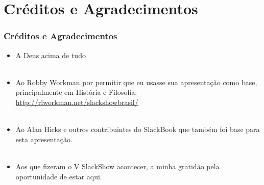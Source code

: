 \documentclass[aspectratio=169]{beamer}
\begin{document}
\section{Créditos e Agradecimentos}

\begin{frame}
	\frametitle{Créditos e Agradecimentos}
	\begin{itemize}
		\item A Deus acima de tudo
		~\\
		~\\
		\item Ao Robby Workman por permitir que eu usasse sua
			apresentação como base, principalmente em História e Filosofia:
			\url{http://rlworkman.net/slackshowbrasil/}
		~\\
		~\\
		\item Ao Alan Hicks e outros contribuintes do SlackBook que também foi
			base para esta apresentação.
		~\\
		~\\
		\item Aos que fizeram o V SlackShow acontecer, a minha gratidão
			pela oportunidade de estar aqui.
	\end{itemize}
\end{frame}
\end{document}
